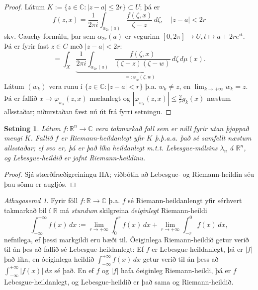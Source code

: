 \documentclass[a4paper,icelandic,11pt]{book}
\theoremstyle{plain}      \newtheorem{setn}{Setning}[chapter]
\theoremstyle{definition} \newtheorem{skilgr}[setn]{Skilgreining}
\theoremstyle{remark}     \newtheorem*{ath}{Athugasemd}
\newcommand{\R}{\mathbb R}
\newcommand{\C}{\mathbb C}
\begin{document}
\begin{proof}
  Látum $K:=\{ z\in\C : |z-a| \le 2r \} \subset U$; þá er
  \[
  f(z,x)
  = \frac{1}{2\pi{i}}\int_{\alpha_{2r}(a)}\frac{f(\zeta,x)}{\zeta-z}\,d\zeta,
  \quad
  |z-a| < 2r
  \]
  skv. Cauchy-formúlu, þar sem $\alpha_{2r}(a)$ er vegurinn
  $[0,2\pi]\to U,t\mapsto a+2re^{it}$. Þá er fyrir fast $z\in C$ með
  $|z-a|<2r$:
  \[
  = \int_{X}\underbrace{
    \frac{1}{2\pi i}
    \int_{\alpha_{2r}(a)}
    \frac{f(\zeta,x)}{(\zeta-z)(\zeta-w)}\,d\zeta \,d\mu(x)
  }_{=:\varphi_{w}(\zeta,w)}.
  \]
  Látum $(w_{k})$ vera runu í $\{z\in\C : |z-a|<r\}$  þ.a. $w_{k}\ne
  z$, en $\lim_{k\to+\infty}w_{k}=z$. Þá er fallið
  $x\to\varphi_{w_{k}}(z,x)$ mælanlegt og
  $|\varphi_{w_{k}}(z,x)|\le\frac{2}{r}g_{k}(x)$ næstum allsstaðar;
  niðurstaðan fæst nú út frá fyrri setningu.
\end{proof}
\begin{setn}
  Látum $f:\R^{n}\to\C$ vera takmarkað fall sem er núll fyrir utan
  þjappað mengi $K$. Fallið $f$ er \emph{Riemann}-heildanlegt yfir $K$
  þ.þ.a.a. það sé samfellt næstum allsstaðar; ef svo er, þá er það
  líka heildanlegt m.t.t. \emph{Lebesgue}-málsins $\lambda_{n}$ á
  $\R^{n}$, og Lebesgue-heildið er jafnt Riemann-heildinu.
\end{setn}
\begin{proof}
  Sjá stærðfræðigreiningu IIA; viðbótin að Lebesgue- og
  Riemann-heildin séu þau sömu er augljós.
\end{proof}
\begin{ath}
  Fyrir föll $f:\R\to\C$ þ.a. $f$ sé Riemann-heildanlengt yfir
  sérhvert takmarkað bil í $\R$ má \emph{stundum} skilgreina
  \emph{óeiginlegt} Riemann-heildi
  \[
  \int_{-\infty}^{+\infty}f(x)\,dx
  := \lim_{r\to+\infty}\int_{0}^{r}f(x)\,dx
  + \lim_{r\to+\infty}\int_{-r}^{0}f(x)\,dx,
  \]
  nefnilega, ef þessi markgildi eru bæði til. Óeiginlega
  Riemann-heildið getur verið til án þes að fallið sé
  Lebesgue-heildanlegt: Ef $f$ er Lebesgue-heildanlegt, þá er $|f|$
  það líka, en óeiginlega heildið $\int_{-\infty}^{+\infty}f(x)\,dx$
  getur verið til án þess að $\int_{-\infty}^{+\infty}|f(x)|\,dx$ sé
  það. En ef $f$ og $|f|$ hafa óeiginleg Riemann-heildi, þá er $f$
  Lebesgue-heildanlegt, og Lebesgue-heildið er það sama og
  Riemann-heildið. 
\end{ath}
\end{document}
